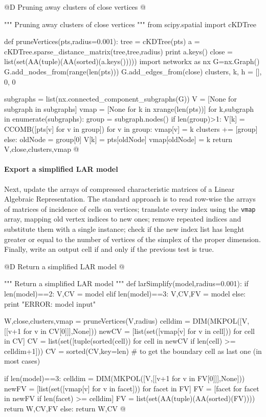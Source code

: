 \documentclass[11pt,oneside]{article}    %
\begin{document}
@D Pruning away clusters of close vertices
@{""" Pruning away clusters of close vertices """
from scipy.spatial import cKDTree

def pruneVertices(pts,radius=0.001):
    tree = cKDTree(pts)
    a = cKDTree.sparse_distance_matrix(tree,tree,radius)
    print a.keys()
    close = list(set(AA(tuple)(AA(sorted)(a.keys()))))
    import networkx as nx
    G=nx.Graph()
    G.add_nodes_from(range(len(pts)))
    G.add_edges_from(close)
    clusters, k, h = [], 0, 0
    
    subgraphs = list(nx.connected_component_subgraphs(G))
    V = [None for subgraph in subgraphs]
    vmap = [None for k in xrange(len(pts))]
    for k,subgraph in enumerate(subgraphs):
        group = subgraph.nodes()
        if len(group)>1: 
            V[k] = CCOMB([pts[v] for v in group])
            for v in group: vmap[v] = k
            clusters += [group]
        else: 
            oldNode = group[0]
            V[k] = pts[oldNode]
            vmap[oldNode] = k
    return V,close,clusters,vmap
@}

\paragraph{Export a simplified LAR model}
Next, update the arrays of compressed characteristic matrices of a Linear Algebraic Representation. The standard approach is to read row-wise the arrays of matrices of incidence of cells on vertices; translate every index using the \texttt{vmap} array, mapping old vertex indices to new ones; remove repeated indices and substitute them with a single instance; check if the new index list has lenght greater or equal to the number of vertices of the simplex of the proper dimension. Finally, write an output cell if and only if the previous test is true.

@D Return a simplified LAR model
@{""" Return a simplified LAR model """
def larSimplify(model,radius=0.001):
    if len(model)==2: V,CV = model 
    elif len(model)==3: V,CV,FV = model 
    else: print "ERROR: model input"
    
    W,close,clusters,vmap = pruneVertices(V,radius)
    celldim = DIM(MKPOL([V,[[v+1 for v in CV[0]]],None]))
    newCV = [list(set([vmap[v] for v in cell])) for cell in CV]
    CV = list(set([tuple(sorted(cell)) for cell in newCV if len(cell) >= celldim+1]))
    CV = sorted(CV,key=len) # to get the boundary cell as last one (in most cases)

    if len(model)==3:
        celldim = DIM(MKPOL([V,[[v+1 for v in FV[0]]],None]))
        newFV = [list(set([vmap[v] for v in facet])) for facet in FV]
        FV = [facet for facet in newFV if len(facet) >= celldim]
        FV = list(set(AA(tuple)(AA(sorted)(FV))))
        return W,CV,FV
    else: return W,CV
@}
\end{document}
